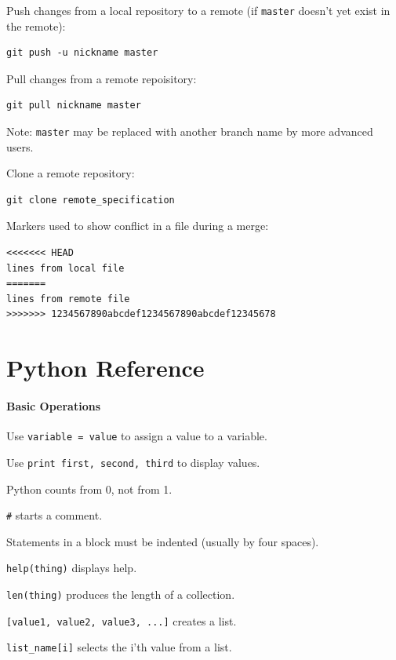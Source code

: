 \documentclass{book}
\begin{document}
Push changes from a local repository to a remote (if \texttt{master}
doesn't yet exist in the remote):

\begin{verbatim}
git push -u nickname master
\end{verbatim}

Pull changes from a remote repoisitory:

\begin{verbatim}
git pull nickname master
\end{verbatim}

Note: \texttt{master} may be replaced with another branch name by more
advanced users.

Clone a remote repository:

\begin{verbatim}
git clone remote_specification
\end{verbatim}

Markers used to show conflict in a file during a merge:

\begin{verbatim}
<<<<<<< HEAD
lines from local file
=======
lines from remote file
>>>>>>> 1234567890abcdef1234567890abcdef12345678
\end{verbatim}

\section{Python Reference}

\mbox{}\paragraph{Basic Operations}

\begin{swcitemize}
\item
  Use \texttt{variable = value} to assign a value to a variable.
\item
  Use \texttt{print first, second, third} to display values.
\item
  Python counts from 0, not from 1.
\item
  \texttt{\#} starts a comment.
\item
  Statements in a block must be indented (usually by four spaces).
\item
  \texttt{help(thing)} displays help.
\item
  \texttt{len(thing)} produces the length of a collection.
\item
  \texttt{{[}value1, value2, value3, ...{]}} creates a list.
\item
  \texttt{list\_name{[}i{]}} selects the i'th value from a list.
\end{swcitemize}
\end{document}
